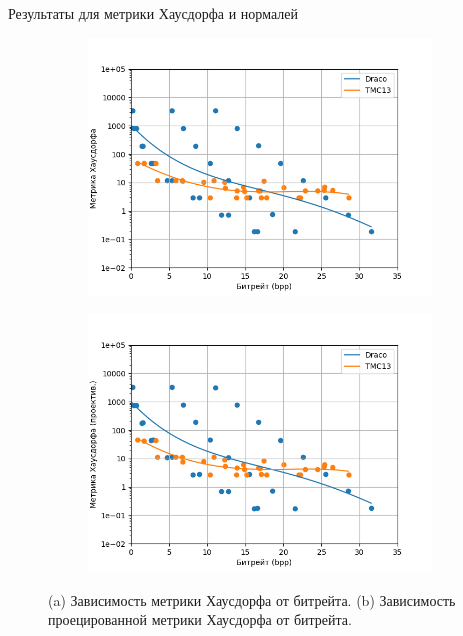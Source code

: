 \documentclass[aspectratio=169]{beamer}
\begin{document}
  \begin{frame}{Результаты для метрики Хаусдорфа и нормалей}
    \begin{figure}[H]
        \centering
        \begin{subfigure}{0.49\textwidth}
            \includegraphics[width=\linewidth]{assets/approx_h_p2pt.png}
            \caption{}
        \end{subfigure}
        \begin{subfigure}{0.49\textwidth}
            \includegraphics[width=\linewidth]{assets/approx_h_p2pl.png}
            \caption{}
        \end{subfigure}
        \caption{ (a) Зависимость метрики Хаусдорфа от битрейта. (b) Зависимость
        проецированной метрики Хаусдорфа от битрейта. }
        \label{img:pcc_arena_hd}
    \end{figure}
  \end{frame}
\end{document}
